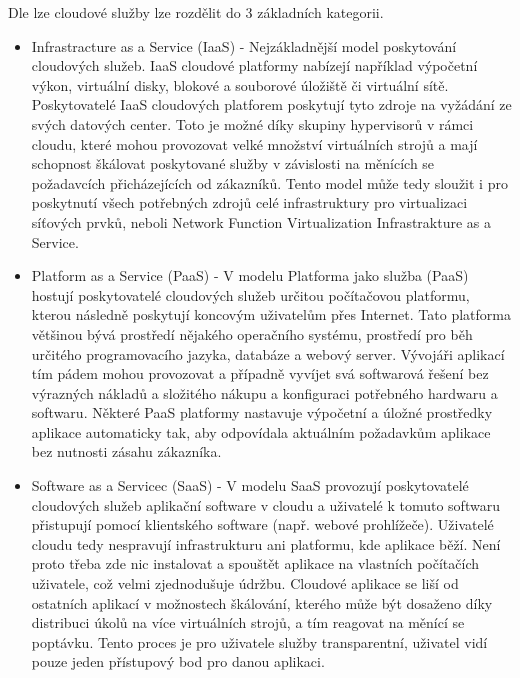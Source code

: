 Dle \cite{CloudSurvey} lze cloudové služby lze rozdělit do 3 základních kategorii. 

\begin{itemize}
\item Infrastracture as a Service (IaaS) - Nejzákladnější  model  poskytování  cloudových  služeb. IaaS cloudové platformy nabízejí například výpočetní výkon, virtuální disky, blokové a souborové úložiště či virtuální sítě.  Poskytovatelé  IaaS  cloudových  platforem  poskytují tyto zdroje na vyžádání ze svých datových center. Toto je možné díky skupiny hypervisorů v rámci cloudu, které mohou provozovat velké množství virtuálních strojů  a  mají  schopnost  škálovat  poskytované  služby v  závislosti  na  měnících  se požadavcích přicházejících od zákazníků. Tento model může tedy sloužit i pro poskytnutí všech potřebných zdrojů celé infrastruktury pro virtualizaci síťových prvků, neboli Network Function Virtualization Infrastrakture as a Service.
\item Platform as a Service (PaaS) - V  modelu  Platforma  jako  služba  (PaaS)  hostují  poskytovatelé cloudových  služeb určitou počítačovou  platformu, kterou následně poskytují koncovým uživatelům přes Internet. Tato platforma většinou bývá prostředí nějakého operačního systému, prostředí  pro  běh  určitého programovacího  jazyka,  databáze  a  webový  server.  Vývojáři  aplikací tím pádem  mohou provozovat a případně vyvíjet svá softwarová řešení bez výrazných nákladů a složitého nákupu a konfiguraci potřebného hardwaru a softwaru. Některé PaaS platformy nastavuje výpočetní  a  úložné  prostředky  aplikace  automaticky  tak,  aby  odpovídala  aktuálním požadavkům aplikace bez nutnosti zásahu zákazníka. 
\item Software as a Servicec (SaaS) - V modelu SaaS provozují poskytovatelé cloudových služeb aplikační software v cloudu a uživatelé  k  tomuto  softwaru  přistupují  pomocí  klientského  software  (např.  webové prohlížeče). Uživatelé  cloudu tedy  nespravují infrastrukturu  ani platformu, kde aplikace běží.  Není  proto  třeba zde nic instalovat  a  spouštět  aplikace  na  vlastních  počítačích uživatele, což velmi zjednodušuje údržbu. Cloudové aplikace se liší od ostatních aplikací v možnostech  škálování, kterého  může  být  dosaženo  díky  distribuci  úkolů  na  více virtuálních strojů, a tím reagovat na měnící se poptávku. Tento proces je pro uživatele služby transparentní, uživatel vidí pouze jeden přístupový bod pro danou aplikaci. 
\end{itemize}


